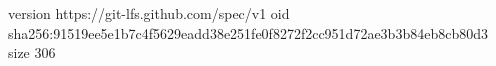 version https://git-lfs.github.com/spec/v1
oid sha256:91519ee5e1b7c4f5629eadd38e251fe0f8272f2cc951d72ae3b3b84eb8cb80d3
size 306
